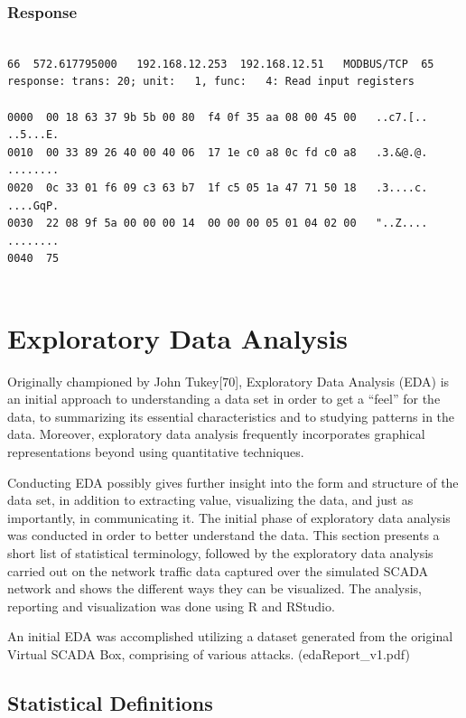 \documentclass[11pt,]{article}
\begin{document}
\subsubsection{Response}\label{response}

\begin{verbatim}

66  572.617795000   192.168.12.253  192.168.12.51   MODBUS/TCP  65
response: trans: 20; unit:   1, func:   4: Read input registers

0000  00 18 63 37 9b 5b 00 80  f4 0f 35 aa 08 00 45 00   ..c7.[.. ..5...E.
0010  00 33 89 26 40 00 40 06  17 1e c0 a8 0c fd c0 a8   .3.&@.@. ........
0020  0c 33 01 f6 09 c3 63 b7  1f c5 05 1a 47 71 50 18   .3....c. ....GqP.
0030  22 08 9f 5a 00 00 00 14  00 00 00 05 01 04 02 00   "..Z.... ........
0040  75
    
\end{verbatim}

\newpage

\section{Exploratory Data Analysis}\label{exploratory-data-analysis}

Originally championed by John Tukey{[}70{]}, Exploratory Data Analysis
(EDA) is an initial approach to understanding a data set in order to get
a ``feel'' for the data, to summarizing its essential characteristics
and to studying patterns in the data. Moreover, exploratory data
analysis frequently incorporates graphical representations beyond using
quantitative techniques.

Conducting EDA possibly gives further insight into the form and
structure of the data set, in addition to extracting value, visualizing
the data, and just as importantly, in communicating it. The initial
phase of exploratory data analysis was conducted in order to better
understand the data. This section presents a short list of statistical
terminology, followed by the exploratory data analysis carried out on
the network traffic data captured over the simulated SCADA network and
shows the different ways they can be visualized. The analysis, reporting
and visualization was done using R and RStudio.

An initial EDA was accomplished utilizing a dataset generated from the
original Virtual SCADA Box, comprising of various attacks.
(edaReport\_v1.pdf)

\subsection{Statistical Definitions}\label{statistical-definitions}
\end{document}
